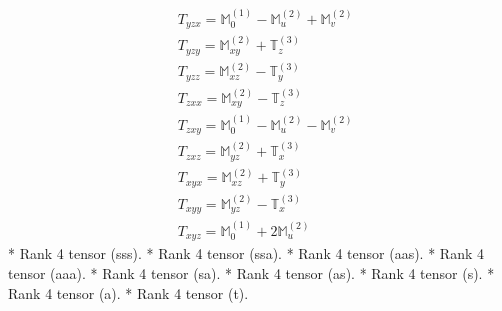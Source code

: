 \documentclass[fleqn,8pt,landscape]{jsarticle}
\begin{document}
\begin{align*}
& T_{yzx} = \mathbb{M}_{0}^{(1)} - \mathbb{M}_{u}^{(2)} + \mathbb{M}_{v}^{(2)} \\
& T_{yzy} = \mathbb{M}_{xy}^{(2)} + \mathbb{T}_{z}^{(3)} \\
& T_{yzz} = \mathbb{M}_{xz}^{(2)} - \mathbb{T}_{y}^{(3)} \\
& T_{zxx} = \mathbb{M}_{xy}^{(2)} - \mathbb{T}_{z}^{(3)} \\
& T_{zxy} = \mathbb{M}_{0}^{(1)} - \mathbb{M}_{u}^{(2)} - \mathbb{M}_{v}^{(2)} \\
& T_{zxz} = \mathbb{M}_{yz}^{(2)} + \mathbb{T}_{x}^{(3)} \\
& T_{xyx} = \mathbb{M}_{xz}^{(2)} + \mathbb{T}_{y}^{(3)} \\
& T_{xyy} = \mathbb{M}_{yz}^{(2)} - \mathbb{T}_{x}^{(3)} \\
& T_{xyz} = \mathbb{M}_{0}^{(1)} + 2 \mathbb{M}_{u}^{(2)}
\end{align*}
* Rank 4 tensor (sss).
* Rank 4 tensor (ssa).
* Rank 4 tensor (aas).
* Rank 4 tensor (aaa).
* Rank 4 tensor (sa).
* Rank 4 tensor (as).
* Rank 4 tensor (s).
* Rank 4 tensor (a).
* Rank 4 tensor (t).
\end{document}
